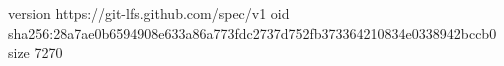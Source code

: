 version https://git-lfs.github.com/spec/v1
oid sha256:28a7ae0b6594908e633a86a773fdc2737d752fb373364210834e0338942bccb0
size 7270

